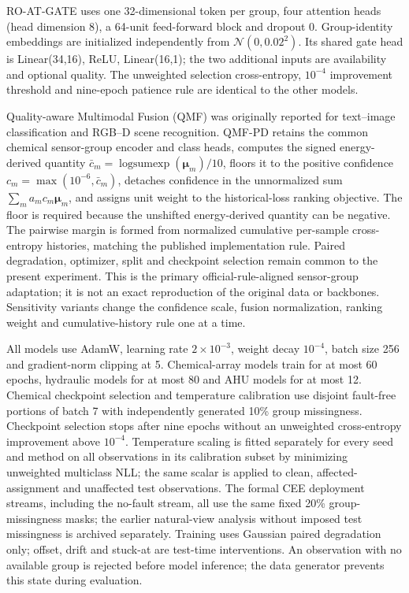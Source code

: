 \documentclass[10pt]{article}
\begin{document}
RO-AT-GATE uses one 32-dimensional token per group, four attention heads (head dimension 8), a 64-unit feed-forward block and dropout 0. Group-identity embeddings are initialized independently from $\mathcal N(0,0.02^2)$. Its shared gate head is Linear(34,16), ReLU, Linear(16,1); the two additional inputs are availability and optional quality. The unweighted selection cross-entropy, $10^{-4}$ improvement threshold and nine-epoch patience rule are identical to the other models.

Quality-aware Multimodal Fusion (QMF) was originally reported for text--image classification and RGB--D scene recognition. QMF-PD retains the common chemical sensor-group encoder and class heads, computes the signed energy-derived quantity $\bar c_m=\operatorname{logsumexp}(\boldsymbol\mu_m)/10$, floors it to the positive confidence $c_m=\max(10^{-6},\bar c_m)$, detaches confidence in the unnormalized sum $\sum_m a_mc_m\boldsymbol\mu_m$, and assigns unit weight to the historical-loss ranking objective. The floor is required because the unshifted energy-derived quantity can be negative. The pairwise margin is formed from normalized cumulative per-sample cross-entropy histories, matching the published implementation rule. Paired degradation, optimizer, split and checkpoint selection remain common to the present experiment. This is the primary official-rule-aligned sensor-group adaptation; it is not an exact reproduction of the original data or backbones. Sensitivity variants change the confidence scale, fusion normalization, ranking weight and cumulative-history rule one at a time.

All models use AdamW, learning rate $2\times10^{-3}$, weight decay $10^{-4}$, batch size 256 and gradient-norm clipping at 5. Chemical-array models train for at most 60 epochs, hydraulic models for at most 80 and AHU models for at most 12. Chemical checkpoint selection and temperature calibration use disjoint fault-free portions of batch 7 with independently generated 10\% group missingness. Checkpoint selection stops after nine epochs without an unweighted cross-entropy improvement above $10^{-4}$. Temperature scaling is fitted separately for every seed and method on all observations in its calibration subset by minimizing unweighted multiclass NLL; the same scalar is applied to clean, affected-assignment and unaffected test observations. The formal CEE deployment streams, including the no-fault stream, all use the same fixed 20\% group-missingness masks; the earlier natural-view analysis without imposed test missingness is archived separately. Training uses Gaussian paired degradation only; offset, drift and stuck-at are test-time interventions. An observation with no available group is rejected before model inference; the data generator prevents this state during evaluation.
\end{document}
